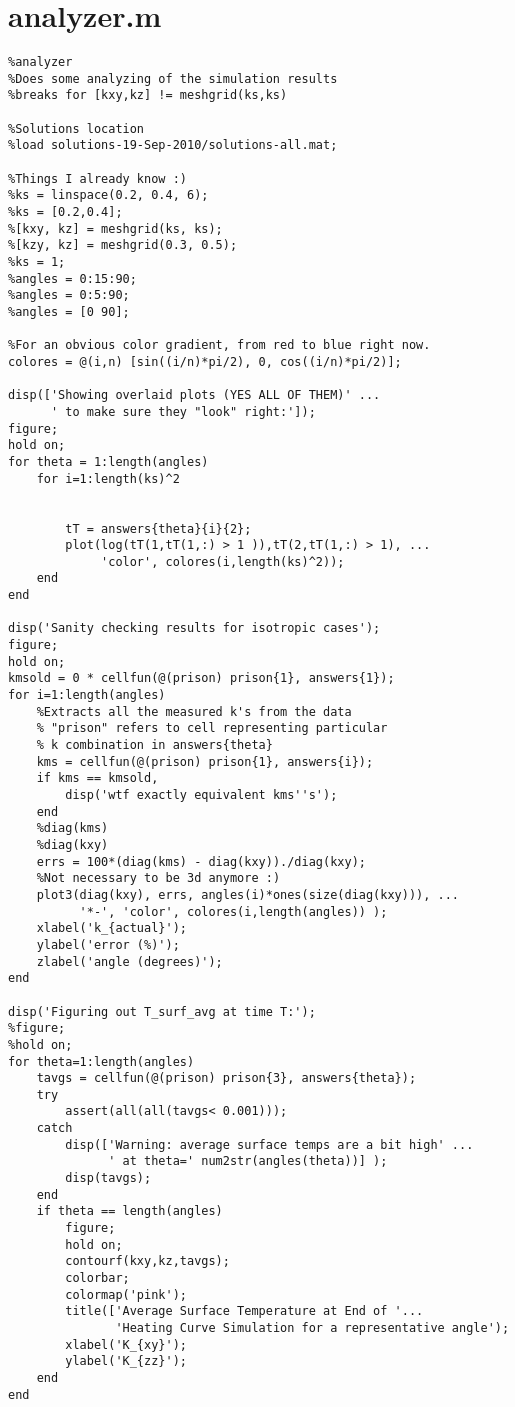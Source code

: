 \section{analyzer.m}
\small
\begin{verbatim}
%analyzer
%Does some analyzing of the simulation results
%breaks for [kxy,kz] != meshgrid(ks,ks)

%Solutions location
%load solutions-19-Sep-2010/solutions-all.mat;

%Things I already know :)
%ks = linspace(0.2, 0.4, 6);
%ks = [0.2,0.4];
%[kxy, kz] = meshgrid(ks, ks);
%[kzy, kz] = meshgrid(0.3, 0.5);
%ks = 1;
%angles = 0:15:90;
%angles = 0:5:90;
%angles = [0 90];

%For an obvious color gradient, from red to blue right now.
colores = @(i,n) [sin((i/n)*pi/2), 0, cos((i/n)*pi/2)];

disp(['Showing overlaid plots (YES ALL OF THEM)' ...
      ' to make sure they "look" right:']);
figure;
hold on;
for theta = 1:length(angles)
    for i=1:length(ks)^2


        tT = answers{theta}{i}{2};
        plot(log(tT(1,tT(1,:) > 1 )),tT(2,tT(1,:) > 1), ...
             'color', colores(i,length(ks)^2));
    end
end

disp('Sanity checking results for isotropic cases');
figure;
hold on;
kmsold = 0 * cellfun(@(prison) prison{1}, answers{1});
for i=1:length(angles)
    %Extracts all the measured k's from the data
    % "prison" refers to cell representing particular
    % k combination in answers{theta}
    kms = cellfun(@(prison) prison{1}, answers{i});
    if kms == kmsold,
        disp('wtf exactly equivalent kms''s');
    end
    %diag(kms)
    %diag(kxy)
    errs = 100*(diag(kms) - diag(kxy))./diag(kxy);
    %Not necessary to be 3d anymore :)
    plot3(diag(kxy), errs, angles(i)*ones(size(diag(kxy))), ...
          '*-', 'color', colores(i,length(angles)) );
    xlabel('k_{actual}');
    ylabel('error (%)');
    zlabel('angle (degrees)');
end

disp('Figuring out T_surf_avg at time T:');
%figure;
%hold on;
for theta=1:length(angles)
    tavgs = cellfun(@(prison) prison{3}, answers{theta});
    try
        assert(all(all(tavgs< 0.001)));
    catch
        disp(['Warning: average surface temps are a bit high' ...
              ' at theta=' num2str(angles(theta))] );
        disp(tavgs);
    end
    if theta == length(angles)
        figure;
        hold on;
        contourf(kxy,kz,tavgs);
        colorbar;
        colormap('pink');
        title(['Average Surface Temperature at End of '...
               'Heating Curve Simulation for a representative angle');
        xlabel('K_{xy}');
        ylabel('K_{zz}');
    end
end


\end{verbatim}

